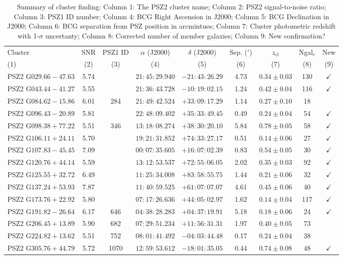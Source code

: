 \documentclass[apj, revtex4-1]{emulateapj}
\begin{document}
\begin{table}
	\caption[Summary of Cluster Finding]{Summary of cluster finding: Column 1: The PSZ2 cluster name; Column 2: PSZ2 signal-to-noise ratio; Column 3: PSZ1 ID number; Column 4: BCG Right Ascension in J2000; Column 5: BCG Declination in J2000; Column 6: BCG separation from PSZ position in arcmintues; Column 7: Cluster photometric redshift with 1-$\sigma$ uncertanty; Column 8: Corrected number of member galaxies; Column 9: New confirmation? }
	\centering
	\begin{tabular}{lcccccccc}
	\hline
	Cluster & SNR & PSZ1 ID & $\alpha$ (J2000) & $\delta$ (J2000) & Sep. ($'$) & $z_\mathrm{cl}$ & Ngal$_c$ & New\\
	(1) & (2) & (3) & (4) & (5) & (6) & (7) & (8) & (9) \\
	\hline
	 PSZ2 G$029.66-47.63$ & 5.74 & \nd & $21:45:29.940$ & $-21:43:26.29$ & 4.73 & $0.34 \pm 0.03$ & 130 & $\checkmark$ \\
	 PSZ2 G$043.44-41.27$ & 5.55 & \nd & $21:36:43.728$ & $-10:19:02.15$ & 1.24 & $0.42 \pm 0.04$ & 116 & $\checkmark$ \\
	 PSZ2 G$084.62-15.86$ & 6.01 & 284 & $21:49:42.524$ & $+33:09:17.29$ & 1.14 & $0.27 \pm 0.10$ & 18 & \\
	 PSZ2 G$096.43-20.89$ & 5.81 & \nd & $22:48:09.402$ & $+35:33:49.45$ & 0.49 & $0.24 \pm 0.04$ & 54 & $\checkmark$ \\
	 PSZ2 G$098.38+77.22$ & 5.51 & 346 & $13:18:08.274$ & $+38:30:20.10$ & 5.84 & $0.78 \pm 0.05$ & 58 & $\checkmark$ \\
	 PSZ2 G$106.11+24.11$ & 5.70 & \nd & $19:21:31.852$ & $+74:33:27.17$ & 0.51 & $0.14 \pm 0.06$ & 27 & $\checkmark$ \\
	 PSZ2 G$107.83-45.45$ & 7.09 & \nd & $00:07:35.605$ & $+16:07:02.39$ & 0.83 & $0.54 \pm 0.05$ & 30 & $\checkmark$ \\
	 PSZ2 G$120.76+44.14$ & 5.59 & \nd & $13:12:53.537$ & $+72:55:06.05$ & 2.02 & $0.35 \pm 0.03$ & 92 & $\checkmark$ \\
	 PSZ2 G$125.55+32.72$ & 6.49 & \nd & $11:25:34.008$ & $+83:58:55.75$ & 1.44 & $0.21 \pm 0.06$ & 32 & $\checkmark$ \\
	 PSZ2 G$137.24+53.93$ & 7.87 & \nd & $11:40:59.525$ & $+61:07:07.07$ & 4.61 & $0.45 \pm 0.06$ & 40 & $\checkmark$ \\
	 PSZ2 G$173.76+22.92$ & 5.80 & \nd & $07:17:26.636$ & $+44:05:02.97$ & 1.62 & $0.14 \pm 0.04$ & 117 & $\checkmark$ \\
	 PSZ2 G$191.82-26.64$ & 6.17 & 646 & $04:38:28.283$ & $+04:37:19.91$ & 5.18 & $0.18 \pm 0.06$ & 24 & $\checkmark$ \\
	 PSZ2 G$206.45+13.89$ & 5.90 & 682 & $07:29:51.234$ & $+11:56:31.31$ & 1.97 & $0.40 \pm 0.05$ & 73 & \\
	 PSZ2 G$224.82+13.62$ & 5.51 & 752 & $08:01:41.492$ & $-04:03:44.48$ & 0.17 & $0.24 \pm 0.04$ & 38 & \\
	 PSZ2 G$305.76+44.79$ & 5.72 & 1070 & $12:59:53.612$ & $-18:01:35.05$ & 0.44 & $0.74 \pm 0.08$ & 48 & $\checkmark$ \\
	\hline
	\end{tabular}
\label{tbl:results}
\end{table}
\end{document}
